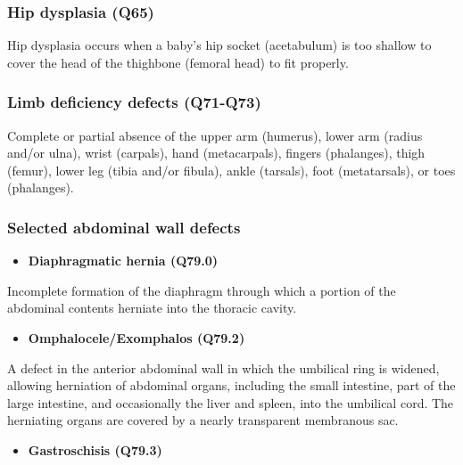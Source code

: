 \documentclass[
]{krantz}
\providecommand{\tightlist}{%
  \setlength{\itemsep}{0pt}\setlength{\parskip}{0pt}}
\begin{document}
\hypertarget{section2119}{%
\subsubsection{Hip dysplasia (Q65)}\label{section2119}}

Hip dysplasia occurs when a baby's hip socket (acetabulum) is too shallow to cover the head of the thighbone (femoral head) to fit properly.

\hypertarget{section21110}{%
\subsubsection{Limb deficiency defects (Q71-Q73)}\label{section21110}}

Complete or partial absence of the upper arm (humerus), lower arm (radius and/or ulna), wrist (carpals), hand (metacarpals), fingers (phalanges), thigh (femur), lower leg (tibia and/or fibula), ankle (tarsals), foot (metatarsals), or toes (phalanges).

\hypertarget{section21111}{%
\subsubsection{Selected abdominal wall defects}\label{section21111}}

\begin{itemize}
\tightlist
\item
  \textbf{Diaphragmatic hernia (Q79.0)}
\end{itemize}

Incomplete formation of the diaphragm through which a portion of the
abdominal contents herniate into the thoracic cavity.

\begin{itemize}
\tightlist
\item
  \textbf{Omphalocele/Exomphalos (Q79.2)}
\end{itemize}

A defect in the anterior abdominal wall in which the umbilical ring is widened, allowing herniation of abdominal organs, including the small intestine, part of the large intestine, and occasionally the liver and spleen, into the umbilical cord. The herniating organs are covered by a nearly transparent membranous sac.

\begin{itemize}
\tightlist
\item
  \textbf{Gastroschisis (Q79.3)}
\end{itemize}
\end{document}

